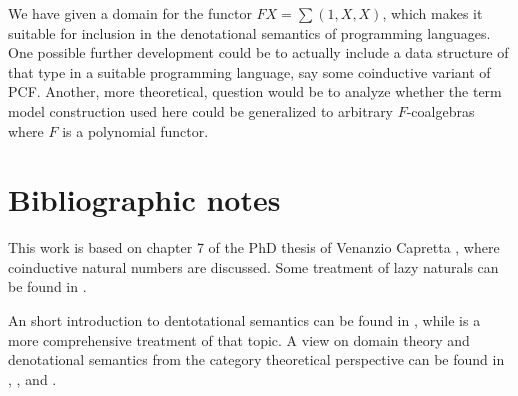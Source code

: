 \documentclass[a4paper]{article}
\begin{document}
We have given a domain for the functor $FX = \sum{(1, X, X)}$, which makes it
suitable for inclusion in the denotational semantics of programming languages.
One possible further development could be to actually include a data structure
of that type in a suitable programming language, say some coinductive variant of
PCF.  Another, more theoretical, question would be to analyze whether the term
model construction used here could be generalized to arbitrary $F$-coalgebras
where $F$ is a polynomial functor.

\section{Bibliographic notes}

This work is based on chapter 7 of the PhD thesis of Venanzio Capretta
\cite{Capretta2002}, where coinductive natural numbers are discussed.  Some
treatment of lazy naturals can be found in \cite{Escardo1993}.

An short introduction to dentotational semantics can be found in
\cite{Allison1986}, while \cite{Gunter1992} is a more comprehensive treatment of
that topic.  A view on domain theory and denotational semantics from the
category theoretical perspective can be found in \cite{Pierce1991},
\cite{Bird1997}, \cite{Mitchell1996} and \cite{BarrWells1990}.




\end{document}
